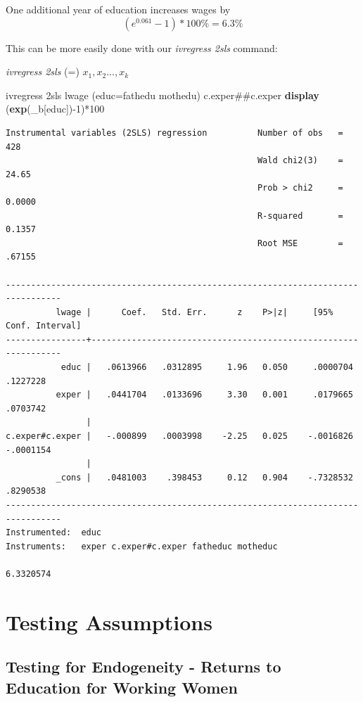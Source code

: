 \documentclass[
]{book}
\newenvironment{Shaded}{\begin{snugshade}}{\end{snugshade}}
\newcommand{\FunctionTok}[1]{\textcolor[rgb]{0.13,0.29,0.53}{\textbf{#1}}}
\newcommand{\KeywordTok}[1]{\textcolor[rgb]{0.13,0.29,0.53}{\textbf{#1}}}
\newcommand{\NormalTok}[1]{#1}
\begin{document}
One additional year of education increases wages by \[ (e^{0.061}-1)*100\%=6.3\% \]

This can be more easily done with our \emph{ivregress 2sls} command:

\emph{ivregress 2sls} \emph{} (\emph{}=\emph{}) \(x_1, x_2...,x_k\)

\begin{Shaded}
\begin{Highlighting}[]
\NormalTok{ivregress 2sls lwage (educ=fathedu mothedu) c.exper\#\#c.exper}
\KeywordTok{display}\NormalTok{ (}\FunctionTok{exp}\NormalTok{(\_b[educ]){-}1)*100}
\end{Highlighting}
\end{Shaded}

\begin{verbatim}
Instrumental variables (2SLS) regression          Number of obs   =        428
                                                  Wald chi2(3)    =      24.65
                                                  Prob > chi2     =     0.0000
                                                  R-squared       =     0.1357
                                                  Root MSE        =     .67155

---------------------------------------------------------------------------------
          lwage |      Coef.   Std. Err.      z    P>|z|     [95% Conf. Interval]
----------------+----------------------------------------------------------------
           educ |   .0613966   .0312895     1.96   0.050     .0000704    .1227228
          exper |   .0441704   .0133696     3.30   0.001     .0179665    .0703742
                |
c.exper#c.exper |   -.000899   .0003998    -2.25   0.025    -.0016826   -.0001154
                |
          _cons |   .0481003    .398453     0.12   0.904    -.7328532    .8290538
---------------------------------------------------------------------------------
Instrumented:  educ
Instruments:   exper c.exper#c.exper fatheduc motheduc

6.3320574
\end{verbatim}

\chapter{Testing Assumptions}\label{testing-assumptions}

\section{Testing for Endogeneity - Returns to Education for Working Women}\label{testing-for-endogeneity---returns-to-education-for-working-women}
\end{document}
